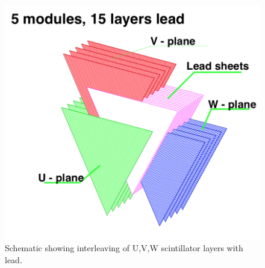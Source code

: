 \begin{figure}
\centering
\includegraphics[scale=0.35]{pcal_layers.png}
\caption[PCAL UVW Layers]{Schematic showing interleaving of U,V,W scintillator layers with lead. }
\label{pcal-layers}
\end{figure}